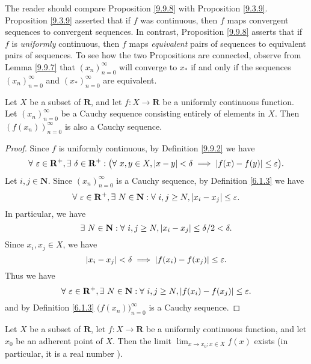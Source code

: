 \begin{remark}\label{9.9.9}
    The reader should compare Proposition \ref{9.9.8} with Proposition \ref{9.3.9}.
    Proposition \ref{9.3.9} asserted that if \(f\) was continuous, then \(f\) maps convergent sequences to convergent sequences.
    In contrast, Proposition \ref{9.9.8} asserts that if \(f\) is \emph{uniformly} continuous, then \(f\) maps \emph{equivalent} pairs of sequences to equivalent pairs of sequences.
    To see how the two Propositions are connected, observe from Lemma \ref{9.9.7} that \((x_n)_{n = 0}^\infty\) will converge to \(x_*\) if and only if the sequences \((x_n)_{n = 0}^\infty\) and \((x_*)_{n = 0}^\infty\) are equivalent.
\end{remark}

\setcounter{theorem}{11}
\begin{proposition}\label{9.9.12}
    Let \(X\) be a subset of \(\mathbf{R}\), and let \(f : X \to \mathbf{R}\) be a uniformly continuous function.
    Let \((x_n)_{n = 0}^\infty\) be a Cauchy sequence consisting entirely of elements in \(X\).
    Then \((f(x_n))_{n = 0}^\infty\) is also a Cauchy sequence.
\end{proposition}

\begin{proof}
    Since \(f\) is uniformly continuous, by Definition \ref{9.9.2} we have
    \[
        \forall\ \varepsilon \in \mathbf{R}^+, \exists\ \delta \in \mathbf{R}^+ : \big(\forall\ x, y \in X, \abs*{x - y} < \delta \implies \abs*{f(x) - f(y)} \leq \varepsilon\big).
    \]
    Let \(i, j \in \mathbf{N}\).
    Since \((x_n)_{n = 0}^\infty\) is a Cauchy sequence, by Definition \ref{6.1.3} we have
    \[
        \forall\ \varepsilon \in \mathbf{R}^+, \exists\ N \in \mathbf{N} : \forall\ i, j \geq N, \abs*{x_i - x_j} \leq \varepsilon.
    \]
    In particular, we have
    \[
        \exists\ N \in \mathbf{N} : \forall\ i, j \geq N, \abs*{x_i - x_j} \leq \delta / 2 < \delta.
    \]
    Since \(x_i, x_j \in X\), we have
    \[
        \abs*{x_i - x_j} < \delta \implies \abs*{f(x_i) - f(x_j)} \leq \varepsilon.
    \]
    Thus we have
    \[
        \forall\ \varepsilon \in \mathbf{R}^+, \exists\ N \in \mathbf{N} : \forall\ i, j \geq N, \abs*{f(x_i) - f(x_j)} \leq \varepsilon.
    \]
    and by Definition \ref{6.1.3} \(\big(f(x_n)\big)_{n = 0}^\infty\) is a Cauchy sequence.
\end{proof}

\setcounter{theorem}{13}
\begin{corollary}\label{9.9.14}
    Let \(X\) be a subset of \(\mathbf{R}\), let \(f : X \to \mathbf{R}\) be a uniformly continuous function, and let \(x_0\) be an adherent point of \(X\).
    Then the limit \(\lim_{x \to x_0 ; x \in X} f(x)\) exists
    (in particular, it is a real number ).
\end{corollary}

